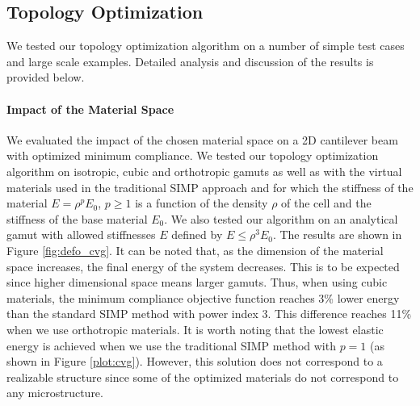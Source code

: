 \subsection{Topology Optimization}
We tested our topology optimization algorithm on a number of simple test cases and large scale examples. Detailed analysis and discussion of the results is provided below.

\paragraph{Impact of the Material Space}
We evaluated the impact of the chosen material space on a 2D cantilever beam with optimized minimum compliance. We tested our topology optimization algorithm on isotropic, cubic and orthotropic gamuts as well as with the virtual materials used in the traditional SIMP approach and for which the stiffness of the material $E=\rho^p E_0$, $p \geq 1$ is a function of the density $\rho$ of the cell and the stiffness of the base material $E_0$. We also tested our algorithm on an analytical gamut with allowed stiffnesses $E$ defined by $E\leq \rho^3 E_0$. The results are shown in Figure \ref{fig:defo_cvg}. It can be noted that, as the dimension of the material space increases, the final energy of the system decreases. This is to be expected since higher dimensional space means larger gamuts.
Thus, when using cubic materials, the minimum compliance objective function reaches 3\% lower energy than the standard SIMP method with power index 3.
This difference reaches 11\% when we use orthotropic materials.
It is worth noting that the lowest elastic energy is achieved when we use the traditional SIMP method with $p=1$ (as shown in Figure \ref{plot:cvg}). However, this solution does not correspond to a realizable structure since some of the optimized materials do not correspond to any microstructure.

